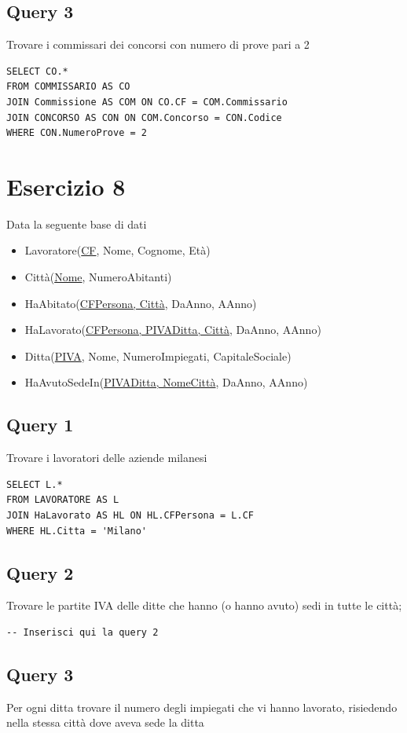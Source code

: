 \subsection{Query 3}
Trovare i commissari dei concorsi con numero di prove pari a 2
\begin{lstlisting}
SELECT CO.*
FROM COMMISSARIO AS CO
JOIN Commissione AS COM ON CO.CF = COM.Commissario
JOIN CONCORSO AS CON ON COM.Concorso = CON.Codice
WHERE CON.NumeroProve = 2
\end{lstlisting}

\newpage
\section{Esercizio 8}
\noindent
Data la seguente base di dati

\begin{itemize}
    \item Lavoratore(\underline{CF}, Nome, Cognome, Età)
    \item Città(\underline{Nome}, NumeroAbitanti)
    \item HaAbitato(\underline{CFPersona, Città}, DaAnno, AAnno)
    \item HaLavorato(\underline{CFPersona, PIVADitta, Città}, DaAnno, AAnno)
    \item Ditta(\underline{PIVA}, Nome, NumeroImpiegati, CapitaleSociale)
    \item HaAvutoSedeIn(\underline{PIVADitta, NomeCittà}, DaAnno, AAnno)
\end{itemize}

\subsection{Query 1}
Trovare i lavoratori delle aziende milanesi
\begin{lstlisting}
SELECT L.*
FROM LAVORATORE AS L
JOIN HaLavorato AS HL ON HL.CFPersona = L.CF
WHERE HL.Citta = 'Milano'
\end{lstlisting}

\subsection{Query 2}
Trovare le partite IVA delle ditte che hanno (o hanno avuto) sedi in tutte le città;
\begin{lstlisting}
-- Inserisci qui la query 2
\end{lstlisting}

\subsection{Query 3}
Per ogni ditta trovare il numero degli impiegati che vi hanno lavorato, risiedendo nella stessa città dove aveva sede la ditta
\begin{lstlisting}
\end{lstlisting}

